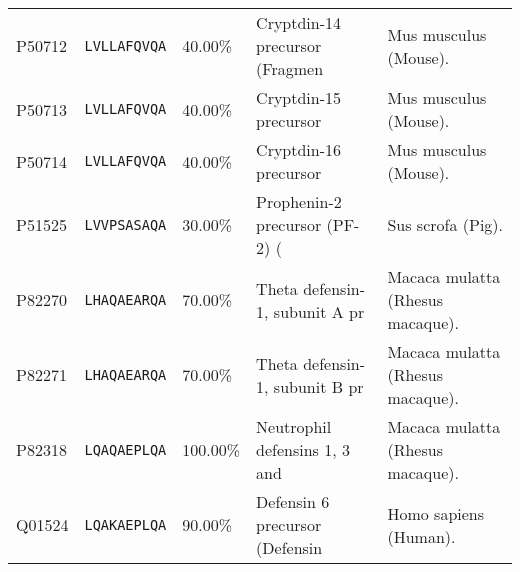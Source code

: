 \begin{sidewaystable}[ptbh]
\begin{tabular}{lllll}
P50712	&	\texttt{LVLLAFQVQA}	&	40.00\%	&	Cryptdin-14 precursor (Fragmen	&	  Mus musculus (Mouse). \\
P50713	&	\texttt{LVLLAFQVQA}	&	40.00\%	&	Cryptdin-15 precursor	&	  Mus musculus (Mouse). \\
P50714	&	\texttt{LVLLAFQVQA}	&	40.00\%	&	Cryptdin-16 precursor	&	  Mus musculus (Mouse). \\
P51525	&	\texttt{LVVPSASAQA}	&	30.00\%	&	Prophenin-2 precursor (PF-2) (	&	  Sus scrofa (Pig). \\
P82270	&	\texttt{LHAQAEARQA}	&	70.00\%	&	Theta defensin-1, subunit A pr	&	  Macaca mulatta (Rhesus macaque). \\
P82271	&	\texttt{LHAQAEARQA}	&	70.00\%	&	Theta defensin-1, subunit B pr	&	  Macaca mulatta (Rhesus macaque). \\
P82318	&	\texttt{LQAQAEPLQA}	&	100.00\%	&	Neutrophil defensins 1, 3 and	&	  Macaca mulatta (Rhesus macaque). \\
Q01524	&	\texttt{LQAKAEPLQA}	&	90.00\%	&	Defensin 6 precursor (Defensin	&	  Homo sapiens (Human). 
	\\ \hline\hline
	\end{tabular}
	\end{sidewaystable}

